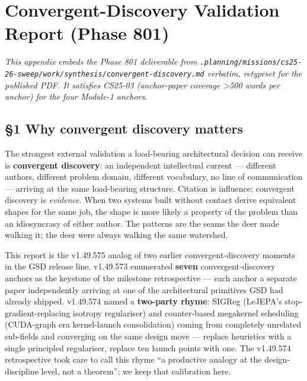 \documentclass[11pt,letterpaper]{article}
\begin{document}
\section{Convergent-Discovery Validation Report (Phase 801)}

\textit{This appendix embeds the Phase 801 deliverable from \texttt{.planning/missions/cs25-26-sweep/work/synthesis/convergent-discovery.md} verbatim, retypeset for the published PDF. It satisfies CS25-03 (anchor-paper coverage \textgreater{}500 words per anchor) for the four Module-1 anchors.}

\subsection{§1 Why convergent discovery
matters}

The strongest external validation a load-bearing architectural decision
can receive is \textbf{convergent discovery}: an independent
intellectual current --- different authors, different problem domain,
different vocabulary, no line of communication --- arriving at the same
load-bearing structure. Citation is influence; convergent discovery is
\emph{evidence}. When two systems built without contact derive
equivalent shapes for the same job, the shape is more likely a property
of the problem than an idiosyncrasy of either author. The patterns are
the seams the deer made walking it; the deer were always walking the
same watershed.

This report is the v1.49.575 analog of two earlier convergent-discovery
moments in the GSD release line. v1.49.573 enumerated \textbf{seven}
convergent-discovery anchors as the keystone of the milestone
retrospective --- each anchor a separate paper independently arriving at
one of the architectural primitives GSD had already shipped. v1.49.574
named a \textbf{two-party rhyme}: SIGReg (LeJEPA's
stop-gradient-replacing isotropy regulariser) and counter-based
megakernel scheduling (CUDA-graph era kernel-launch consolidation)
coming from completely unrelated sub-fields and converging on the same
design move --- replace heuristics with a single principled regulariser,
replace ten launch points with one. The v1.49.574 retrospective took
care to call this rhyme ``a productive analogy at the design-discipline
level, not a theorem''; we keep that calibration here.
\end{document}
